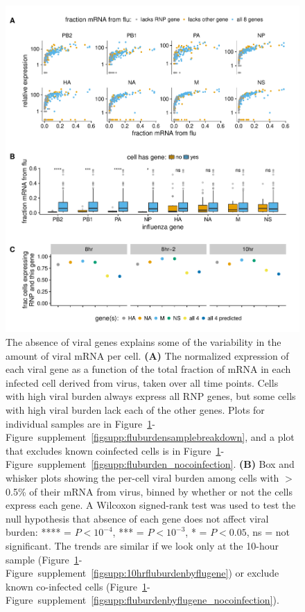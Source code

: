 \documentclass[9pt,lineno]{elife}
\begin{document}
\begin{figure}[t!]
\centerline{\includegraphics[width=0.9\linewidth]{figures/p_flu_burden_flu_gene_merge.pdf}}
\caption{\label{fig:fluburdenbyflugene}
The absence of viral genes explains some of the variability in the amount of viral mRNA per cell.
{\bf (A)} 
The normalized expression of each viral gene as a function of the total fraction of mRNA in each infected cell derived from virus, taken over all time points.
Cells with high viral burden always express all RNP genes, but some cells with high viral burden lack each of the other genes.
Plots for individual samples are in Figure~\ref{fig:fluburdenbyflugene}-Figure~supplement~\ref{figsupp:fluburdensamplebreakdown}, and a plot that excludes known coinfected cells is in Figure~\ref{fig:fluburdenbyflugene}-Figure~supplement~\ref{figsupp:fluburden_nocoinfection}.
{\bf (B)}
Box and whisker plots showing the per-cell viral burden among cells with $>$0.5\% of their mRNA from virus, binned by whether or not the cells express each gene.
A Wilcoxon signed-rank test was used to test the null hypothesis that absence of each gene does not affect viral burden: **** = $P < 10^{-4}$, *** = $P < 10^{-3}$,  * = $P < 0.05$, ns = not significant.
The trends are similar if we look only at the 10-hour sample (Figure~\ref{fig:fluburdenbyflugene}-Figure~supplement~\ref{figsupp:10hrfluburdenbyflugene}) or exclude known co-infected cells (Figure~\ref{fig:fluburdenbyflugene}-Figure~supplement~\ref{figsupp:fluburdenbyflugene_nocoinfection}).
}
\end{figure}
\end{document}
